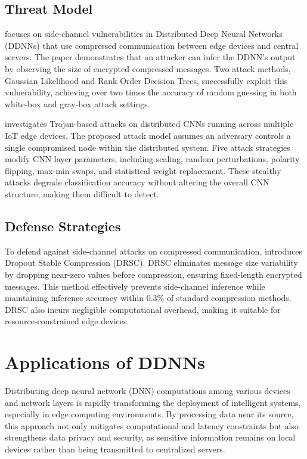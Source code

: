 \documentclass[conference]{IEEEtran}
\begin{document}
\subsection{Threat Model}
\cite{kannan2024security} focuses on side-channel vulnerabilities in Distributed Deep Neural Networks (DDNNs) that use compressed communication between edge devices and central servers. The paper demonstrates that an attacker can infer the DDNN’s output by observing the size of encrypted compressed messages. Two attack methods, Gaussian Likelihood and Rank Order Decision Trees, successfully exploit this vulnerability, achieving over two times the accuracy of random guessing in both white-box and gray-box attack settings.

\cite{mohammed2020secure} investigates Trojan-based attacks on distributed CNNs running across multiple IoT edge devices. The proposed attack model assumes an adversary controls a single compromised node within the distributed system. Five attack strategies modify CNN layer parameters, including scaling, random perturbations, polarity flipping, max-min swaps, and statistical weight replacement. These stealthy attacks degrade classification accuracy without altering the overall CNN structure, making them difficult to detect.

\subsection{Defense Strategies}
To defend against side-channel attacks on compressed communication, \cite{kannan2024security} introduces Dropout Stable Compression (DRSC). DRSC eliminates message size variability by dropping near-zero values before compression, ensuring fixed-length encrypted messages. This method effectively prevents side-channel inference while maintaining inference accuracy within 0.3\% of standard compression methods. DRSC also incurs negligible computational overhead, making it suitable for resource-constrained edge devices.



\section{Applications of DDNNs}

Distributing deep neural network (DNN) computations among various devices and network layers is rapidly transforming the deployment of intelligent systems, especially in edge computing environments. By processing data near its source, this approach not only mitigates computational and latency constraints but also strengthens data privacy and security, as sensitive information remains on local devices rather than being transmitted to centralized servers.
\end{document}
